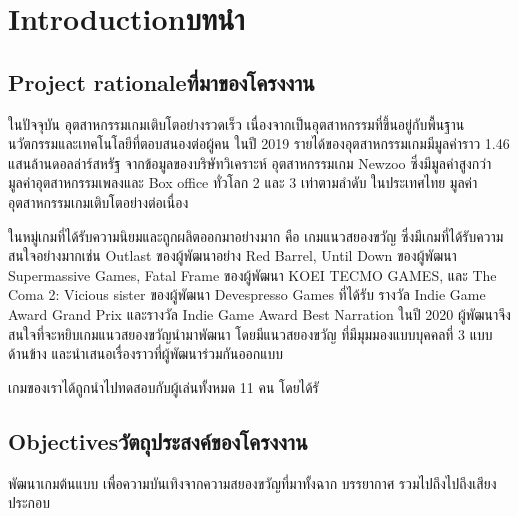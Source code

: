 \chapter{\ifenglish Introduction\else บทนำ\fi}

\section{\ifenglish Project rationale\else ที่มาของโครงงาน\fi}
ในปัจจุบัน อุตสาหกรรมเกมเติบโตอย่างรวดเร็ว เนื่องจากเป็นอุตสาหกรรมที่ขึ้นอยู่กับพื้นฐานนวัตกรรมและเทคโนโลยีที่ตอบสนองต่อผู้คน ในปี 2019 รายได้ของอุตสาหกรรมเกมมีมูลค่าราว 1.46 แสนล้านดอลล่าร์สหรัฐ จากข้อมูลของบริษัทวิเคราะห์
อุตสาหกรรมเกม Newzoo ซึ่งมีมูลค่าสูงกว่ามูลค่าอุตสาหกรรมเพลงและ Box office ทั่วโลก 2 และ 3 เท่าตามลำดับ ในประเทศไทย มูลค่าอุตสาหกรรมเกมเติบโตอย่างต่อเนื่อง 


ในหมู่เกมที่ได้รับความนิยมและถูกผลิตออกมาอย่างมาก คือ เกมแนวสยองขวัญ ซึ่งมีเกมที่ได้รับความสนใจอย่างมากเช่น Outlast ของผู้พัฒนาอย่าง Red Barrel, Until Down ของผู้พัฒนา Supermassive Games, 
Fatal Frame ของผู้พัฒนา KOEI TECMO GAMES, และ The Coma 2: Vicious sister ของผู้พัฒนา Devespresso Games ที่ได้รับ รางวัล Indie Game Award Grand Prix และรางวัล Indie Game Award Best Narration 
ในปี 2020 ผู้พัฒนาจึงสนใจที่จะหยิบเกมแนวสยองขวัญนำมาพัฒนา โดยมีแนวสยองขวัญ ที่มีมุมมองแบบบุคคลที่ 3 แบบด้านข้าง และนำเสนอเรื่องราวที่ผู้พัฒนาร่วมกันออกแบบ

เกมของเราได้ถูกนำไปทดสอบกับผู้เล่นทั้งหมด 11 คน โดยได้รั
\section{\ifenglish Objectives\else วัตถุประสงค์ของโครงงาน\fi}

พัฒนาเกมต้นแบบ เพื่อความบันเทิงจากความสยองขวัญที่มาทั้งฉาก บรรยากาศ รวมไปถึงไปถึงเสียงประกอบ

